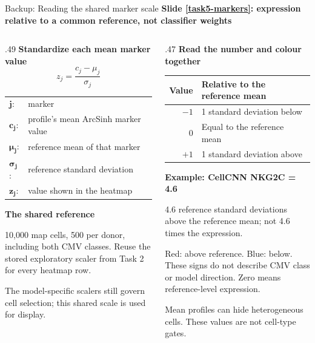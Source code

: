 \documentclass[aspectratio=169,10pt]{beamer}
\newcommand{\eyebrow}[1]{{\color{Teal}\bfseries #1}\par\smallskip}
\newcommand{\compactmath}{%
  \setlength{\abovedisplayskip}{4pt}\setlength{\belowdisplayskip}{4pt}%
  \setlength{\abovedisplayshortskip}{2pt}\setlength{\belowdisplayshortskip}{4pt}}
\begin{document}
\begin{frame}{Backup: Reading the shared marker scale}
  \small
  \eyebrow{Slide \ref{task5-markers}: expression relative to a common reference, not classifier weights}
  \begin{columns}[T,onlytextwidth]
    \begin{column}{.49\textwidth}
      \textbf{Standardize each mean marker value}
      \compactmath
      \[z_j=\frac{c_j-\mu_j}{\sigma_j}\]
      {\scriptsize\begin{tabular}{@{}l@{\quad}>{\raggedright\arraybackslash}p{.78\linewidth}@{}}
        $\boldsymbol{j}$: & marker\\
        $\boldsymbol{c_j}$: & profile's mean ArcSinh marker value\\
        $\boldsymbol{\mu_j}$: & reference mean of that marker\\
        $\boldsymbol{\sigma_j}$: & reference standard deviation\\
        $\boldsymbol{z_j}$: & value shown in the heatmap
      \end{tabular}}\par\medskip
      \textbf{The shared reference}\par
      10,000 map cells, 500 per donor, including both CMV classes. Reuse the stored exploratory scaler from Task 2 for every heatmap row.\par\smallskip
      The model-specific scalers still govern cell selection; this shared scale is used for display.
    \end{column}
    \begin{column}{.47\textwidth}
      \textbf{Read the number and colour together}\par\smallskip
      \begin{tabular}{@{}rl@{}}\toprule
        Value & Relative to the reference mean\\\midrule
        $-1$ & 1 standard deviation below\\
        $0$ & Equal to the reference mean\\
        $+1$ & 1 standard deviation above\\\bottomrule
      \end{tabular}\par\medskip
      \textbf{Example: CellCNN NKG2C = 4.6}\par
      4.6 reference standard deviations above the reference mean; not 4.6 times the expression.\par\medskip
      Red: above reference. Blue: below. These signs do not describe CMV class or model direction. Zero means reference-level expression.\par\smallskip
      Mean profiles can hide heterogeneous cells. These values are not cell-type gates.
    \end{column}
  \end{columns}
\end{frame}
\end{document}
